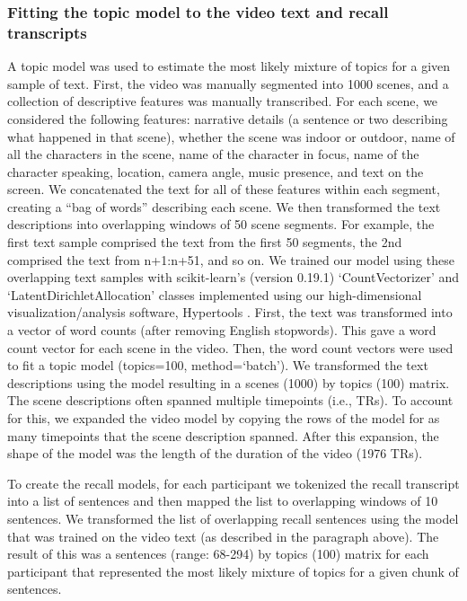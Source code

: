 \documentclass{article}
\begin{document}
\subsubsection*{Fitting the topic model to the video text and recall transcripts}
A topic model was used to estimate the most likely mixture of topics for a given sample of text. First, the video was manually segmented into 1000 scenes, and a collection of descriptive features was manually transcribed. For each scene, we considered the following features: narrative details (a sentence or two describing what happened in that scene), whether the scene was indoor or outdoor, name of all the characters in the scene, name of the character in focus, name of the character speaking, location, camera angle, music presence, and text on the screen. We concatenated the text for all of these features within each segment, creating a ``bag of words'' describing each scene. We then transformed the text descriptions into overlapping windows of 50 scene segments. For example, the first text sample comprised the text from the first 50 segments, the 2nd comprised the text from n+1:n+51, and so on. We trained our model using these overlapping text samples with scikit-learn's (version 0.19.1) `CountVectorizer' and `LatentDirichletAllocation' classes \citep{PedrEtal11} implemented using our high-dimensional visualization/analysis software, Hypertools \citep{HeusEtal18}.  First, the text was transformed into a vector of word counts (after removing English stopwords). This gave a word count vector for each scene in the video.  Then, the word count vectors were used to fit a topic model (topics=100, method=`batch'). We transformed the text descriptions using the model resulting in a scenes (1000) by topics (100) matrix. The scene descriptions often spanned multiple timepoints (i.e., TRs). To account for this, we expanded the video model by copying the rows of the model for as many timepoints that the scene description spanned. After this expansion, the shape of the model was the length of the duration of the video (1976 TRs).

To create the recall models, for each participant we tokenized the recall transcript into a list of sentences and then mapped the list to overlapping windows of 10 sentences.  We transformed the list of overlapping recall sentences using the model that was trained on the video text (as described in the paragraph above). The result of this was a sentences (range: 68-294) by topics (100) matrix for each participant that represented the most likely mixture of topics for a given chunk of sentences.
\end{document}
